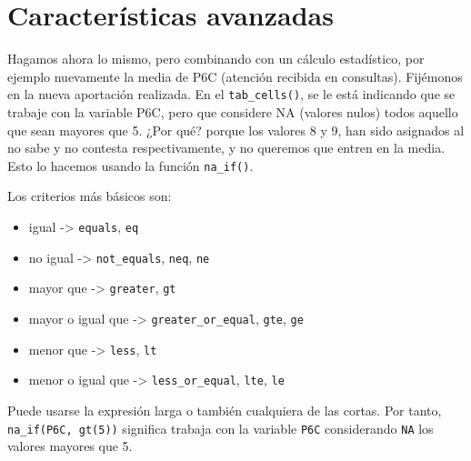 \documentclass[
]{book}
\providecommand{\tightlist}{%
  \setlength{\itemsep}{0pt}\setlength{\parskip}{0pt}}
\begin{document}
\hypertarget{caracteruxedsticas-avanzadas}{%
\section{Características avanzadas}\label{caracteruxedsticas-avanzadas}}

Hagamos ahora lo mismo, pero combinando con un cálculo estadístico, por ejemplo nuevamente la media de P6C (atención recibida en consultas). Fijémonos en la nueva aportación realizada. En el \texttt{tab\_cells()}, se le está indicando que se trabaje con la variable P6C, pero que considere NA (valores nulos) todos aquello que sean mayores que 5. ¿Por qué? porque los valores 8 y 9, han sido asignados al no sabe y no contesta respectivamente, y no queremos que entren en la media. Esto lo hacemos usando la función \texttt{na\_if()}.

Los criterios más básicos son:

\begin{itemize}
\tightlist
\item
  igual -\textgreater{} \texttt{equals}, \texttt{eq}
\item
  no igual -\textgreater{} \texttt{not\_equals}, \texttt{neq}, \texttt{ne}
\item
  mayor que -\textgreater{} \texttt{greater}, \texttt{gt}
\item
  mayor o igual que -\textgreater{} \texttt{greater\_or\_equal}, \texttt{gte}, \texttt{ge}
\item
  menor que -\textgreater{} \texttt{less}, \texttt{lt}
\item
  menor o igual que -\textgreater{} \texttt{less\_or\_equal}, \texttt{lte}, \texttt{le}
\end{itemize}

Puede usarse la expresión larga o también cualquiera de las cortas. Por tanto, \texttt{na\_if(P6C,\ gt(5))} significa trabaja con la variable \texttt{P6C} considerando \texttt{NA} los valores mayores que 5.
\end{document}
